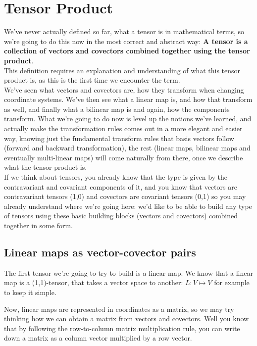 \section{Tensor Product}

We've never actually defined so far, what a tensor is in mathematical terms, so we're going to do this now in the most correct
and abstract way: \textbf{A tensor is a collection of vectors and covectors combined together using the tensor product}.\\

This definition requires an explanation and understanding of what this tensor product is, as this is the first time 
we encounter the term.\\

We've seen what vectors and covectors are, how they transform when changing coordinate systems.
We've then see what a linear map is, and how that transform as well, and finally what a bilinear map is and again, how the components
transform.
What we're going to do now is level up the notions we've learned, and actually make the transformation rules comes out in a more 
elegant and easier way, knowing just the fundamental transform rules that basis vectors follow (forward and backward transformation), the rest
(linear maps, bilinear maps and eventually multi-linear maps) will come naturally from there, once we describe what the tensor product is.\\

If we think about tensors, you already know that the type is given by the contravariant and covariant components of it, and you know that
vectors are contravariant tensors (1,0) and covectors are covariant tensors (0,1) so you may already understand where we're going here: we'd like to 
be able to build any type of tensors using these basic building blocks (vectors and covectors) combined together in some form.

\subsection{Linear maps as vector-covector pairs}

The first tensor we're going to try to build is a linear map.
We know that a linear map is a (1,1)-tensor, that takes a vector space to another: $\textit{L} : V \mapsto V$ for example to keep it simple.

Now, linear maps are represented in coordinates as a matrix, so we may try thinking how we can obtain a matrix from vectors and covectors.
Well you know that by following the row-to-column matrix multiplication rule, you can write down a matrix as a column vector multiplied by a row vector.\\

